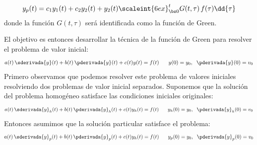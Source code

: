 \begin{align}
y_{p} (t) = c_{1} y_{1} (t) + c_{2} y_{2} (t) +  y_{2} (t) \scaleint{6ex}_{\bs 0}^{t} G (t,\tau) \, f (\tau) \dd{\tau}
\label{eq:ecuacion_07_11}
\end{align}
donde la función $G (t,\tau)$ será identificada como la función de Green.
\par
El objetivo es entonces desarrollar la técnica de la función de Green para resolver el problema de valor inicial:
\begin{align}
a (t) \, \sderivada{y} (t) + b (t) \, \pderivada{y} (t) + c (t) y(t) = f (t) \hspace{0.6cm} y (0) = y_{0}, \hspace{0.2cm} \pderivada{y} (0) = v_{0}
\label{eq:ecuacion_07_12}
\end{align}
Primero observamos que podemos resolver este problema de valores iniciales resolviendo dos problemas de valor inicial separados. Suponemos que la solución del problema homogéneo satisface las condiciones iniciales originales:
\begin{align}
a (t) \, \sderivada{y}_{h} (t) + b (t) \, \pderivada{y}_{h} (t) + c (t) y_{h} (t) = f (t) \hspace{0.6cm} y_{h} (0) = y_{0}, \hspace{0.2cm} \pderivada{y}_{h} (0) = v_{0}
\label{eq:ecuacion_07_13}
\end{align}
Entonces asumimos que la solución particular satisface el problema:
\begin{align}
a (t) \, \sderivada{y}_{p} (t) + b (t) \, \pderivada{y}_{p} (t) + c (t) y_{h} (t) = f (t) \hspace{0.6cm} y_{p} (0) = y_{0}, \hspace{0.2cm} \pderivada{y}_{p} (0) = v_{0}
\label{eq:ecuacion_07_14}
\end{align}

